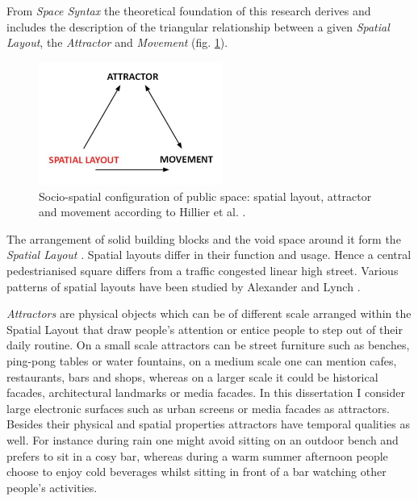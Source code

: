 From \textit{Space Syntax} the theoretical foundation of this research derives and includes the description of the triangular relationship between a given \textit{Spatial Layout}, the \textit{Attractor} and \textit{Movement} (fig. \ref{attractor_movement}).


\begin{figure}[h!] 
\centering
\includegraphics[width=6cm]{Illustrations/attractor_movement.pdf}
\caption [Spatial Layout, Attractor, Movement] {Socio-spatial configuration of public space: spatial layout, attractor and movement according to Hillier et al. \cite{Hillier_1993}.}
\label{attractor_movement}
\end{figure}


The arrangement of solid building blocks and the void space around it form the \textit{Spatial Layout} . Spatial layouts differ in their function and usage. Hence a central pedestrianised square differs from a traffic congested linear high street. 
Various patterns of spatial layouts have been studied by Alexander \cite{Alexander_1981} and Lynch \cite{Lynch_1960}.

\textit{Attractors} are physical objects which can be of different scale arranged  within the Spatial Layout that draw people's attention or entice people to step out of their daily routine. On a small scale attractors can be street furniture such as benches, ping-pong tables or water fountains, on a medium scale one can mention cafes, restaurants, bars and shops, whereas on a larger scale it could be historical facades, architectural landmarks or media facades. In this dissertation I consider large electronic surfaces such as urban screens or media facades as attractors. Besides their physical and spatial properties attractors have temporal qualities as well. For instance during rain one might avoid sitting on an outdoor bench and prefers to sit in a cosy bar, whereas during a warm summer afternoon people choose to enjoy cold beverages whilst sitting in front of a bar watching other people's activities.

